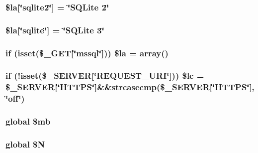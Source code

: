 \subsubsection[{\$la}]{\setlength{\rightskip}{0pt plus 5cm}\$la[\char`\"{}sqlite2\char`\"{}] = \char`\"{}SQLite 2\char`\"{}}\label{da/d8e/adminer_8php_a3cb2a91912c0eabafbca3ad4296f94ad}
\subsubsection[{\$la}]{\setlength{\rightskip}{0pt plus 5cm}\$la[\char`\"{}sqlite\char`\"{}] = \char`\"{}SQLite 3\char`\"{}}\label{da/d8e/adminer_8php_abcfc18dba6ce264426815166464fb3da}
\subsubsection[{\$la}]{\setlength{\rightskip}{0pt plus 5cm}if (isset(\$\_\-GET[\char`\"{}mssql\char`\"{}])) \$la = array()}\label{da/d8e/adminer_8php_a0530e7a677d318c4e7c9a7bcc040481b}
\subsubsection[{\$lc}]{\setlength{\rightskip}{0pt plus 5cm}if (!isset(\$\_\-SERVER[\char`\"{}REQUEST\_\-URI\char`\"{}])) \$lc = \$\_\-SERVER[\char`\"{}HTTPS\char`\"{}]\&\&strcasecmp(\$\_\-SERVER[\char`\"{}HTTPS\char`\"{}],\char`\"{}off\char`\"{})}\label{da/d8e/adminer_8php_a05f3d4bd2b02633f83b6c8494163b323}
\subsubsection[{\$mb}]{\setlength{\rightskip}{0pt plus 5cm}global \$mb}\label{da/d8e/adminer_8php_a07e8c381a870f2fc6bb1ec6030fda6b5}
\subsubsection[{\$N}]{\setlength{\rightskip}{0pt plus 5cm}global \$N}\label{da/d8e/adminer_8php_a77693a9216d29b1c9cb361c7d03410cd}
